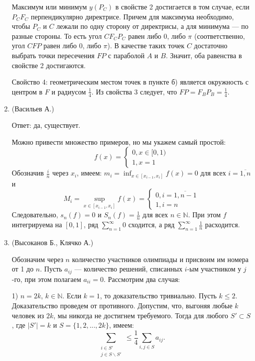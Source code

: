 \begin{enumerate}
Максимум или минимум $y(P_C)$ в свойстве 2 достигается в том случае, если $P_CF_C$ перпендикулярно директрисе. Причем для максимума необходимо, чтобы $P_C$ и $C$ лежали по одну сторону от директрисы, а для минимума --- по разные стороны. То есть угол $CF_CP_C$ равен либо 0, либо $\pi$ (соответственно, угол $CFP$ равен либо 0, либо $\pi$). В качестве таких точек $C$ достаточно выбрать точки  пересечения $FP$ с параболой $A$ и $B$. Значит, оба равенства в свойстве 2 достигаются.

Свойство 4: геометрическим местом точек в пункте б) является окружность с центром в $F$ и радиусом $\frac{1}{4}$. Из свойства 3 следует, что $FP = F_BP_B = \frac{1}{4}$.

\item (Васильев А.)

Ответ: да, существует.

Можно привести множество примеров, но мы укажем самый простой:
$$
f(x) =
\begin{cases}
0, x \in [0, 1)\\
1, x = 1
\end{cases}
$$
Обозначив $\frac{i}{n}$ через $x_i$, имеем: $m_i = \inf_{x \in [x_{i-1}, x_i]} f(x) = 0$ для всех $i = \overline{1,n}$ и 
$$M_i = \sup_{x \in [x_{i-1}, x_i]} f(x) =\begin{cases} 
0, i = \overline{1, n-1} \\ 
1, i = n
\end{cases}
$$
Следовательно, $s_n(f) = 0$ и $S_n(f) = \frac{1}{n}$ для всех $n \in \mathbb{N}$. При этом $f$ интегрируема на $[0, 1]$, ряд $\displaystyle \sum_{n=1}^{\infty} 0$ сходится, а ряд $\displaystyle \sum_{n=1}^{\infty} \frac{1}{n}$ расходится.

\item (Высоканов Б., Клячко А.)

Обозначим через $n$ количество участников олимпиады и присвоим им номера от 1 до $n$. Пусть $a_{ij}$ --- количество решений, списанных $i$-ым участником у $j$-го, при этом полагаем $a_{ii} = 0$. Рассмотрим два случая:

1) $n = 2k$, $k \in \mathbb{N}$. Если $k = 1$, то доказательство тривиально. Пусть $k \leqslant 2$. Доказательство проведем от противного. Допустим, что, выгоняя любые $k$ человек из $2k$, мы никогда не достигнем требуемого. Тогда для любого $S' \subset S$, где $|S'| = k$ и $S = \{1, 2, ..., 2k \}$, имеем:
$$\sum_{\substack{i \in S' \\ j \in S \backslash S'}} \leqslant \frac{1}{4} \sum_{i, j \in S} a_{ij}.$$


\end{enumerate}
